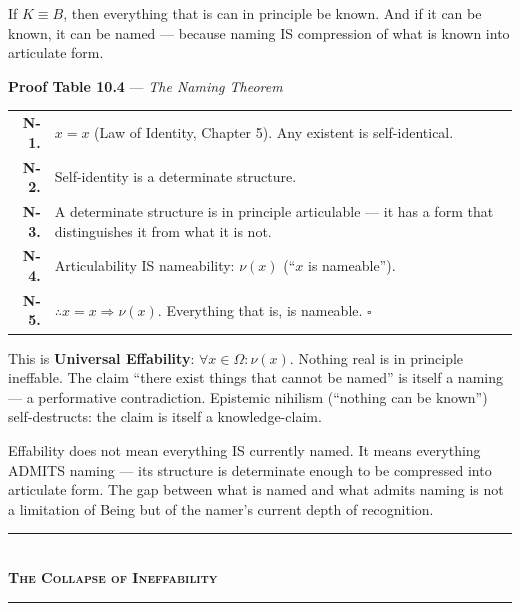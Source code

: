\documentclass[10pt, openany, oneside]{book}
\renewcommand{\normalsize}{\fontsize{10}{13}\selectfont}
\renewcommand{\footnotesize}{\fontsize{8.5}{11}\selectfont}
\begin{document}
\vspace{1em}

\noindent If $K \equiv B$, then everything that is can in principle be known. And if it can be known, it can be named --- because naming IS compression of what is known into articulate form.

\textbf{Proof Table 10.4} --- \textit{The Naming Theorem}

\vspace{0.5em}

{\footnotesize
\noindent\begin{tabular}{r p{}}
\textbf{N-1.} & $x = x$ (Law of Identity, Chapter 5). Any existent is self-identical. \\[0.3em]
\textbf{N-2.} & Self-identity is a determinate structure. \\[0.3em]
\textbf{N-3.} & A determinate structure is in principle articulable --- it has a form that distinguishes it from what it is not. \\[0.3em]
\textbf{N-4.} & Articulability IS nameability: $\nu(x)$ (``$x$ is nameable''). \\[0.3em]
\textbf{N-5.} & $\therefore x = x \Rightarrow \nu(x)$. Everything that is, is nameable. $\square$ \\[0.3em]
\end{tabular}
}

\vspace{0.8em}

\noindent This is \textbf{Universal Effability}: $\forall x \in \Omega: \nu(x)$. Nothing real is in principle ineffable. The claim ``there exist things that cannot be named'' is itself a naming --- a performative contradiction. Epistemic nihilism (``nothing can be known'') self-destructs: the claim is itself a knowledge-claim.

Effability does not mean everything IS currently named. It means everything ADMITS naming --- its structure is determinate enough to be compressed into articulate form. The gap between what is named and what admits naming is not a limitation of Being but of the namer's current depth of recognition.

\vspace{1.5em}


\begin{center}
    \rule{0.3\textwidth}{0.4pt}\\[0.5em]
    {\normalsize\bfseries\scshape The Collapse of Ineffability}\\[0.3em]
    \rule{0.3\textwidth}{0.4pt}
\end{center}
\end{document}
